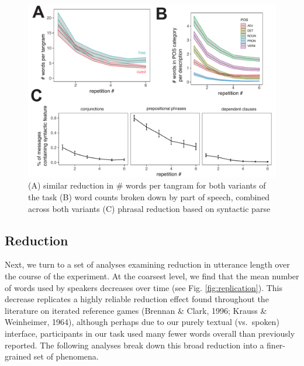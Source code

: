 \documentclass[alpha-refs]{wiley-article}
\begin{document}
\begin{figure}[t]
\includegraphics[scale=.65]{reduction.pdf}
\caption{(A) similar reduction in \# words per tangram for both variants of the task (B) word counts broken down by part of speech, combined across both variants (C) phrasal reduction based on syntactic parse }
\label{fig:reduction}
\end{figure}

\subsection{Reduction}\label{reduction}

Next, we turn to a set of analyses examining reduction in utterance
length over the course of the experiment. At the coarsest level, we find
that the mean number of words used by speakers decreases over time (see
Fig. \ref{fig:replication}). This decrease replicates a highly reliable
reduction effect found throughout the literature on iterated reference
games (Brennan \& Clark, 1996; Krauss \& Weinheimer, 1964), although
perhaps due to our purely textual (vs.~spoken) interface, participants
in our task used many fewer words overall than previously reported. The
following analyses break down this broad reduction into a finer-grained
set of phenomena.
\end{document}
